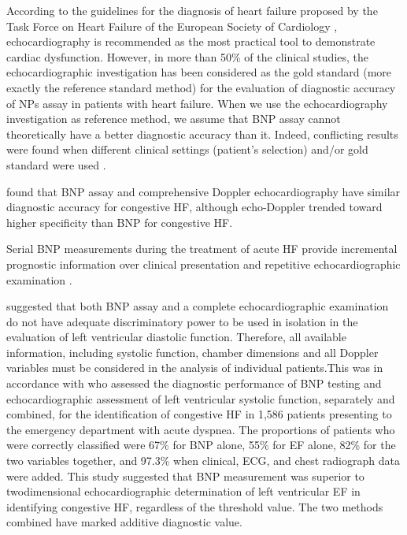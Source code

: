 \documentclass[14pt,a4paper,onecolumn]{extarticle}
\begin{document}
According to the guidelines for the diagnosis of heart failure proposed by the Task Force on Heart Failure of the European Society of Cardiology \citep{bib369}, echocardiography is recommended as the most practical tool to demonstrate cardiac dysfunction. However, in more than 50\% of the clinical studies, the echocardiographic investigation has been considered as the gold standard (more exactly the reference standard method) for the evaluation of diagnostic accuracy of NPs assay in patients with heart failure.  When we use the echocardiography investigation as reference method, we assume that BNP assay cannot theoretically have a better diagnostic accuracy than it. Indeed, conflicting results were found when different clinical settings (patient’s selection) and/or gold standard were used \citep{bib35} \citep{bib372}.

\citep{bib3178} found that BNP assay and comprehensive Doppler echocardiography have similar diagnostic accuracy for congestive HF, although echo-Doppler trended toward higher specificity than BNP for congestive HF.

Serial BNP measurements during the treatment of acute HF provide incremental prognostic information over clinical presentation and repetitive echocardiographic examination \citep{bib3179}.

\citep{bib3180} suggested that both BNP assay and a complete echocardiographic examination do not have adequate discriminatory power to be used in isolation in the evaluation of left ventricular diastolic function. Therefore, all available information, including systolic function, chamber dimensions and all Doppler variables must be considered in the analysis of individual patients.This was in accordance with \citep{bib3181} who assessed the diagnostic performance of BNP testing and echocardiographic assessment of left ventricular systolic function, separately and combined, for the identification of congestive HF in 1,586 patients presenting to the emergency department with acute dyspnea. The proportions of patients who were correctly classified were 67\% for BNP alone, 55\% for EF alone, 82\% for the two variables together, and 97.3\% when clinical, ECG, and chest radiograph data were added. This study suggested that BNP measurement was superior to twodimensional echocardiographic determination of left ventricular EF in identifying congestive HF, regardless of the threshold value. The two methods combined have marked additive diagnostic value.
\end{document}
